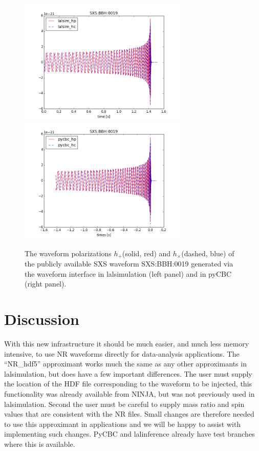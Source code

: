 \documentclass[aps,prd,amssymb,amsmath,amsfonts,superscriptaddress,
floatfix ,preprintnumbers,altaffilletter]{revtex4}
\begin{document}
\begin{figure}
\begin{center}
\includegraphics[width=80mm]{lalsim_TD_0019.png}
\includegraphics[width=80mm]{pycbc_TD_0019.png}
\caption{The waveform polarizations $h_+$(solid, red) and $h_\times$(dashed, blue) of the publicly available SXS waveform SXS:BBH:0019 
generated via the waveform interface in lalsimulation (left panel) and in pyCBC (right panel).}
\label{fig:waveforms}
\end{center}
\end{figure}


\section{Discussion}
\label{sec:discussion}

With this new infrastructure it should be much easier, and much less memory intensive, to use NR waveforms
directly for data-analysis applications. The ``NR\_hdf5'' approximant works much the same as any other approximants
in lalsimulation, but does have a few important differences. The user must supply the location of the HDF file
corresponding to the waveform to be injected, this functionality was already available from NINJA, but was not
previously used in lalsimulation. Second the user must be careful to supply mass ratio and spin values that
are consistent with the NR files. Small changes are therefore needed to use this approximant in applications
and we will be happy to assist with implementing such changes. PyCBC and lalinference already have test branches
where this is available.
\end{document}
